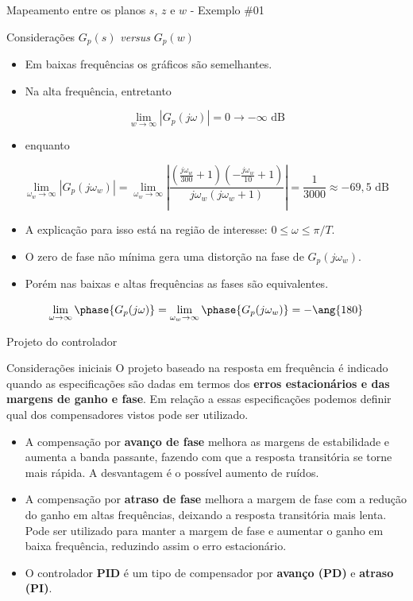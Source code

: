\begin{frame}{Mapeamento entre os planos $s$, $z$ e $w$ - Exemplo \#01}
\begin{block}{Considerações $G_p(s)$ \textit{versus} $G_p(w)$ }
	\begin{itemize}
	    \item Em baixas frequências os gráficos são semelhantes.
        \item Na alta frequência, entretanto
    \end{itemize}
$$ \lim_{w \to \infty} \left | G_p(j\omega) \right | = 0 \to -\infty \text{ dB}$$
    \begin{itemize}
        \item[] enquanto
    \end{itemize}
$$\lim_{\omega_w \to \infty} \left | G_p(j\omega_w) \right | = \lim_{\omega_w \to \infty} \left | \dfrac{\left ( \frac{j\omega_w}{300} + 1\right ) \left ( -\frac{j\omega_w}{10} +1 \right )}{j\omega_w(j\omega_w+1)} \right |= \dfrac{1}{3000}\approx - 69,5 \text{ dB}$$
    \begin{itemize}
        \item A explicação para isso está na região de interesse: $ 0 \leq \omega \leq \pi/T $.
        \item O zero de fase não mínima gera uma distorção na fase de $G_p(j\omega_w)$.
        \item Porém nas baixas e altas frequências as fases são equivalentes.
    \end{itemize}
$$\lim_{\omega \to \infty} \phase{G_p(j\omega)}  = \lim_{\omega_w \to \infty} \phase{G_p(j\omega_w)} = -\ang{180}$$
\end{block}
\end{frame}

\begin{frame}{Projeto do controlador}
    \begin{block}{Considerações iniciais}
    O projeto baseado na resposta em frequência é indicado quando as especificações são dadas em termos dos \textbf{erros estacionários e das margens de ganho e fase}. Em relação a essas especificações podemos definir qual dos compensadores vistos pode ser utilizado.
    \begin{itemize}
        \item A compensação por \textbf{avanço de fase} melhora as margens de estabilidade e aumenta a banda passante, fazendo com que a resposta transitória se torne mais rápida. A desvantagem é o possível aumento de ruídos.
        \item A compensação por \textbf{atraso de fase} melhora a margem de fase com a redução do ganho em altas frequências, deixando a resposta transitória mais lenta. Pode ser utilizado para manter a margem de fase e aumentar o ganho em baixa frequência, reduzindo assim o erro estacionário.
        \item O controlador \textbf{PID} é um tipo de compensador por \textbf{avanço (PD)} e \textbf{atraso (PI)}.
    \end{itemize}
    \end{block}
\end{frame}


